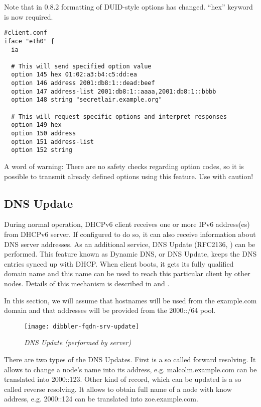 Note that in 0.8.2 formatting of DUID-style options has
changed. ``hex'' keyword is now required.

\begin{lstlisting}
#client.conf
iface "eth0" {
  ia

  # This will send specified option value  
  option 145 hex 01:02:a3:b4:c5:dd:ea
  option 146 address 2001:db8:1::dead:beef
  option 147 address-list 2001:db8:1::aaaa,2001:db8:1::bbbb
  option 148 string "secretlair.example.org"

  # This will request specific options and interpret responses
  option 149 hex
  option 150 address
  option 151 address-list
  option 152 string
\end{lstlisting}

A word of warning: There are no safety checks regarding option codes,
so it is possible to transmit already defined options using this
feature. Use with caution!

\subsection{DNS Update}
\label{feature-dns-update}
During normal operation, DHCPv6 client receives one or more IPv6
address(es) from DHCPv6 server. If configured to do so, it can also
receive information about DNS server addresses. As an additional
service, DNS Update (RFC2136, \cite{rfc2136}) can be performed. This
feature known as Dynamic DNS, or DNS Update, keeps the DNS entries
synced up with DHCP. When client boots, it gets its fully qualified
domain name and this name can be used to reach this particular client
by other nodes. Details of this mechanism is described
in \cite{rfc2136} and \cite{rfc4704}.

\Note In this section, we will assume that hostnames will be used from
the example.com domain and that addresses will be provided from the
2000::/64 pool.

\begin{figure}[ht]
\begin{center}
\texttt{[image: dibbler-fqdn-srv-update]}
\caption{\emph{DNS Update (performed by server)}}
\end{center}
\end{figure}

There are two types of the DNS Updates. First is a so called forward
resolving. It allows to change a node's name into its address,
e.g. malcolm.example.com can be translated into 2000::123. Other kind
of record, which can be updated is a so called reverse resolving. It
allows to obtain full name of a node with know address, e.g. 2000::124
can be translated into zoe.example.com.

